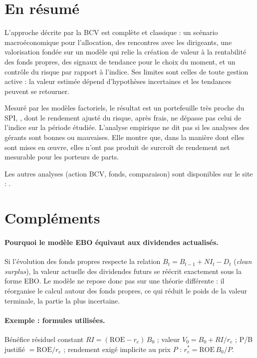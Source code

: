 \documentclass[11pt,a4paper]{article}
\begin{document}
\section{En résumé}

L'approche décrite par la BCV est complète et classique : un scénario macroéconomique pour l'allocation, des rencontres avec les dirigeants, une valorisation fondée sur un modèle qui relie la création de valeur à la rentabilité des fonds propres, des signaux de tendance pour le choix du moment, et un contrôle du risque par rapport à l'indice. Ses limites sont celles de toute gestion active : la valeur estimée dépend d'hypothèses incertaines et les tendances peuvent se retourner.

Mesuré par les modèles factoriels, le résultat est un portefeuille très proche du SPI, \MomCourt{}, dont le rendement ajusté du risque, après frais, ne dépasse pas celui de l'indice sur la période étudiée. L'analyse empirique ne dit pas si les analyses des gérants sont bonnes ou mauvaises. Elle montre que, dans la manière dont elles sont mises en œuvre, elles n'ont pas produit de surcroît de rendement net mesurable pour les porteurs de parts.

Les autres analyses (action BCV, fonds, comparaison) sont disponibles sur le site : \URLSite.

\appendix
\section{Compléments}

\paragraph{Pourquoi le modèle EBO équivaut aux dividendes actualisés.} Si l'évolution des fonds propres respecte la relation $B_t = B_{t-1} + NI_t - D_t$ (\emph{clean surplus}), la valeur actuelle des dividendes futurs se réécrit exactement sous la forme EBO. Le modèle ne repose donc pas sur une théorie différente : il réorganise le calcul autour des fonds propres, ce qui réduit le poids de la valeur terminale, la partie la plus incertaine.

\paragraph{Exemple : formules utilisées.} Bénéfice résiduel constant $RI = (\mathrm{ROE} - r_e)\,B_0$ ; valeur $V_0 = B_0 + RI/r_e$ ; P/B justifié $= \mathrm{ROE}/r_e$ ; rendement exigé implicite au prix $P$ : $r_e^{*} = \mathrm{ROE}\,B_0/P$.
\end{document}
